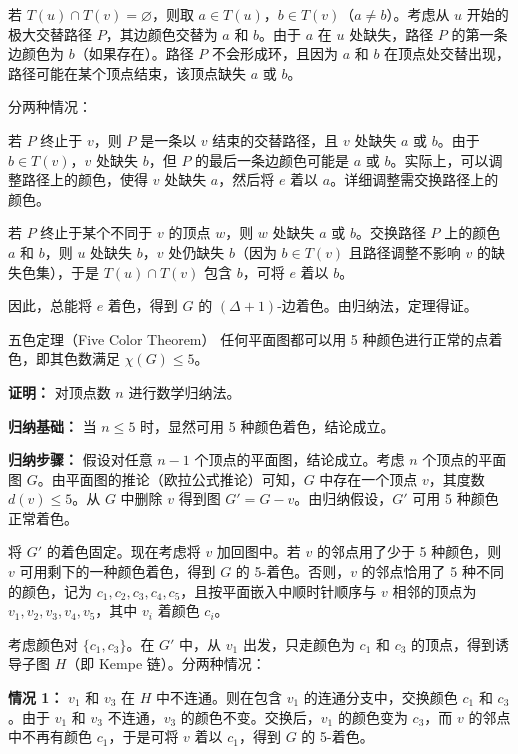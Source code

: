     若 $T(u) \cap T(v) = \varnothing$，则取 $a \in T(u)$，$b \in T(v)$（$a \neq b$）。考虑从 $u$ 开始的极大交替路径 $P$，其边颜色交替为 $a$ 和 $b$。由于 $a$ 在 $u$ 处缺失，路径 $P$ 的第一条边颜色为 $b$（如果存在）。路径 $P$ 不会形成环，且因为 $a$ 和 $b$ 在顶点处交替出现，路径可能在某个顶点结束，该顶点缺失 $a$ 或 $b$。

    分两种情况：
    
    若 $P$ 终止于 $v$，则 $P$ 是一条以 $v$ 结束的交替路径，且 $v$ 处缺失 $a$ 或 $b$。由于 $b \in T(v)$，$v$ 处缺失 $b$，但 $P$ 的最后一条边颜色可能是 $a$ 或 $b$。实际上，可以调整路径上的颜色，使得 $v$ 处缺失 $a$，然后将 $e$ 着以 $a$。详细调整需交换路径上的颜色。

    若 $P$ 终止于某个不同于 $v$ 的顶点 $w$，则 $w$ 处缺失 $a$ 或 $b$。交换路径 $P$ 上的颜色 $a$ 和 $b$，则 $u$ 处缺失 $b$，$v$ 处仍缺失 $b$（因为 $b \in T(v)$ 且路径调整不影响 $v$ 的缺失色集），于是 $T(u) \cap T(v)$ 包含 $b$，可将 $e$ 着以 $b$。
    
    因此，总能将 $e$ 着色，得到 $G$ 的 $(\Delta+1)$-边着色。由归纳法，定理得证。

\begin{theorem}{五色定理（Five Color Theorem）}{}
    任何平面图都可以用 5 种颜色进行正常的点着色，即其色数满足 $\chi(G) \le 5$。
\end{theorem}
\textbf{证明：} 对顶点数 $n$ 进行数学归纳法。

    \textbf{归纳基础：} 当 $n \le 5$ 时，显然可用 5 种颜色着色，结论成立。

    \textbf{归纳步骤：} 假设对任意 $n-1$ 个顶点的平面图，结论成立。考虑 $n$ 个顶点的平面图 $G$。由平面图的推论（欧拉公式推论）可知，$G$ 中存在一个顶点 $v$，其度数 $d(v) \le 5$。从 $G$ 中删除 $v$ 得到图 $G' = G - v$。由归纳假设，$G'$ 可用 5 种颜色正常着色。

    将 $G'$ 的着色固定。现在考虑将 $v$ 加回图中。若 $v$ 的邻点用了少于 5 种颜色，则 $v$ 可用剩下的一种颜色着色，得到 $G$ 的 5-着色。否则，$v$ 的邻点恰用了 5 种不同的颜色，记为 $c_1, c_2, c_3, c_4, c_5$，且按平面嵌入中顺时针顺序与 $v$ 相邻的顶点为 $v_1, v_2, v_3, v_4, v_5$，其中 $v_i$ 着颜色 $c_i$。

    考虑颜色对 $\{c_1, c_3\}$。在 $G'$ 中，从 $v_1$ 出发，只走颜色为 $c_1$ 和 $c_3$ 的顶点，得到诱导子图 $H$（即 Kempe 链）。分两种情况：

    \textbf{情况 1：} $v_1$ 和 $v_3$ 在 $H$ 中不连通。则在包含 $v_1$ 的连通分支中，交换颜色 $c_1$ 和 $c_3$。由于 $v_1$ 和 $v_3$ 不连通，$v_3$ 的颜色不变。交换后，$v_1$ 的颜色变为 $c_3$，而 $v$ 的邻点中不再有颜色 $c_1$，于是可将 $v$ 着以 $c_1$，得到 $G$ 的 5-着色。

